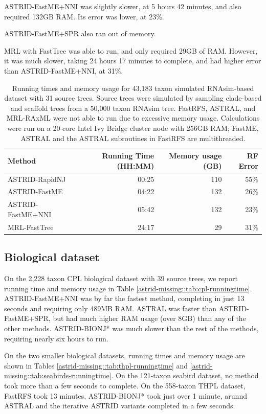 ASTRID-FastME+NNI was slightly slower, at 5 hours 42 minutes, and also required 132GB RAM. Its error was lower, at 23\%.

ASTRID-FastME+SPR also ran out of memory.

MRL with FastTree was able to run, and only required 29GB of RAM. However, it was much slower, taking 24 hours 17 minutes to complete, and had higher error than ASTRID-FastME+NNI, at 31\%.

\begin{table}[]
    \centering
\begin{tabular}{l|rrr}
     Method & Running Time (HH:MM) & Memory usage (GB) & RF Error\\
    \hline
     ASTRID-RapidNJ & 00:25 & 110 & 55\%\\
     ASTRID-FastME & 04:22 & 132 & 26\% \\
     ASTRID-FastME+NNI & 05:42 & 132 & 23\% \\
     MRL-FastTree & 24:17 & 29 & 31\%
\end{tabular}
\caption[Running times and memory usage for 43,183 taxon simulated RNAsim-based dataset]{Running times and memory usage for 43,183 taxon simulated RNAsim-based dataset with 31 source trees. Source trees were simulated by sampling clade-based and scaffold trees from a 50,000 taxon RNAsim tree. FastRFS, ASTRAL, and MRL-RAxML were not able to run due to excessive memory usage. Calculations were run on a 20-core Intel Ivy Bridge cluster node with 256GB RAM; FastME, ASTRAL and the ASTRAL subroutines in FastRFS are multithreaded.}
\label{astrid-missing::tab:rnasim-runningtime}
\end{table}


\subsection{Biological dataset}
On the 2,228 taxon CPL biological dataset with 39 source trees, we report running time and memory usage in Table \ref{astrid-missing::tab:cpl-runningtime}. ASTRID-FastME+NNI was by far the fastest method, completing in just 13 seconds and requiring only 489MB RAM. ASTRAL was faster than ASTRID-FastME+SPR, but had much higher RAM usage (over 8GB) than any of the other methods. ASTRID-BIONJ* was much slower than the rest of the methods, requiring nearly six hours to run.

On the two smaller biological datasets, running times and memory usage are shown in Tables \ref{astrid-missing::tab:thpl-runningtime} and \ref{astrid-missing::tab:seabirds-runningtime}. On the 121-taxon seabird dataset, no method took more than a few seconds to complete. On the 558-taxon THPL dataset, FastRFS took 13 minutes, ASTRID-BIONJ* took just over 1 minute, arunnd ASTRAL and the iterative ASTRID variants completed in a few seconds.

